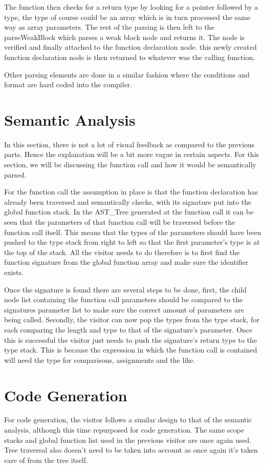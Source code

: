 \documentclass[12pt, a4paper]{report}
\begin{document}
The function then checks for a return type by looking for a pointer followed by a type, the type of course could be an array which is in turn processed the same way as array parameters. The rest of the parsing is then left to the parseWeakBlock which parses a weak block node and returns it. The node is verified and finally attached to the function declaration node. this newly created function declaration node is then returned to whatever was the calling function.

Other parsing elements are done in a similar fashion where the conditions and format are hard coded into the compiler.

\section{Semantic Analysis}
In this section, there is not a lot of visual feedback as compared to the previous parts. Hence the explanation will be a bit more vague in certain aspects. For this section, we will be discussing the function call and how it would be semantically parsed.

For the function call the assumption in place is that the function declaration has already been traversed and semantically checks, with its signature put into the global function stack. In the AST\_Tree generated at the function call it can be seen that the parameters of that function call will be traversed before the function call itself. This means that the types of the parameters should have been pushed to the type stack from right to left so that the first parameter's type is at the top of the stack. All the visitor needs to do therefore is to first find the function signature from the global function array and make sure the identifier exists. 

Once the signature is found there are several steps to be done, first, the child node list containing the function call parameters should be compared to the signatures parameter list to make sure the correct amount of parameters are being called. Secondly, the visitor can now pop the types from the type stack, for each comparing the length and type to that of the signature's parameter. Once this is successful the visitor just needs to push the signature's return type to the type stack. This is because the expression in which the function call is contained will need the type for comparisons, assignments and the like.

\section{Code Generation}
For code generation, the visitor follows a similar design to that of the semantic analysis, although this time repurposed for code generation. The same scope stacks and global function list used in the previous visitor are once again used. Tree traversal also doesn't need to be taken into account as once again it's taken care of from the tree itself. 
\end{document}
